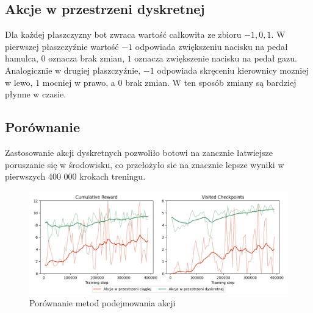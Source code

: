 \subsection{Akcje w przestrzeni dyskretnej}
Dla każdej płaszczyzny bot zwraca wartość całkowita ze zbioru ${-1, 0, 1}$. W pierwszej płaszczyźnie wartość $-1$ odpowiada zwiększeniu nacisku na pedał hamulca, $0$ oznacza brak zmian, $1$ oznacza zwiększenie nacisku na pedał gazu. Analogicznie w drugiej plaszczyźnie, $-1$ odpowiada skręceniu kierownicy mozniej w lewo, $1$ mocniej w prawo, a $0$ brak zmian. W ten sposób zmiany są bardziej płynne w czasie.

\subsection{Porównanie}
Zastosowanie akcji dyskretnych pozwoliło botowi na zancznie łatwiejsze poruszanie się w środowisku, co przełożyło sie na znacznie lepsze wyniki w pierwszych 400 000 krokach treningu.
\begin{figure}[H]
    \centering
    \includegraphics[width=\textwidth]{graphs/output_actions}
    \caption{Porównanie metod podejmowania akcji}
    \label{fig}
\end{figure}
\clearpage

